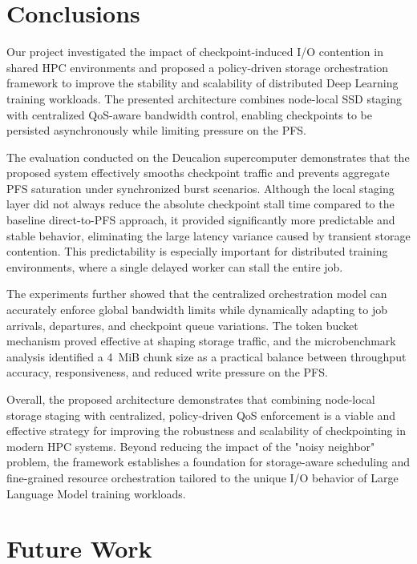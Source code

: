 \documentclass[sigplan,twocolumn,10pt,nonacm]{acmart}
\begin{document}
\section{Conclusions}

Our project investigated the impact of checkpoint-induced I/O contention
in shared HPC environments and proposed a policy-driven storage orchestration
framework to improve the stability and scalability of distributed Deep Learning
training workloads. The presented architecture combines node-local SSD staging
with centralized QoS-aware bandwidth control, enabling checkpoints to be
persisted asynchronously while limiting pressure on the PFS.

The evaluation conducted on the Deucalion supercomputer demonstrates that the
proposed system effectively smooths checkpoint traffic and prevents aggregate
PFS saturation under synchronized burst scenarios. Although the local staging
layer did not always reduce the absolute checkpoint stall time compared to the
baseline direct-to-PFS approach, it provided significantly more predictable and
stable behavior, eliminating the large latency variance caused by transient
storage contention. This predictability is especially important for distributed
training environments, where a single delayed worker can stall the entire job.

The experiments further showed that the centralized orchestration model can
accurately enforce global bandwidth limits while dynamically adapting to job
arrivals, departures, and checkpoint queue variations. The token bucket
mechanism proved effective at shaping storage traffic, and the microbenchmark
analysis identified a 4~MiB chunk size as a practical balance between
throughput accuracy, responsiveness, and reduced write pressure on the PFS.

Overall, the proposed architecture demonstrates that combining node-local
storage staging with centralized, policy-driven QoS enforcement is a viable and
effective strategy for improving the robustness and scalability of checkpointing
in modern HPC systems. Beyond reducing the impact of the "noisy neighbor" problem,
the framework establishes a foundation for storage-aware scheduling and
fine-grained resource orchestration tailored to the unique I/O behavior of
Large Language Model training workloads.

\section{Future Work}
\end{document}
